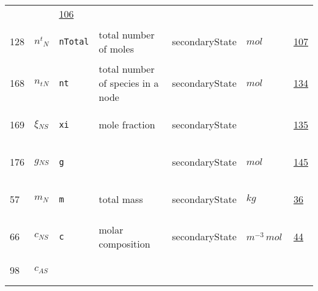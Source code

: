 \begin{longtable}{|p{1cm}|p{2.5cm}|p{4.5cm}|p{8cm}|p{3.0cm}|p{3cm}|p{1cm}|}
             & $  $
             &                 \hyperlink{"e:106"}{ 106 }
                 \\
            128
             & \hypertarget{"v:128"}{ $ {{n^t}}{_{N}} $}
             & \verb|nTotal|
             & total number of moles
             & \begin{lay}secondaryState \end{lay}
             & $ mol \, $
             &                 \hyperlink{"e:107"}{ 107 }
                 \\
            168
             & \hypertarget{"v:168"}{ $ {n_t}{_{N}} $}
             & \verb|nt|
             & total number of species in a node
             & \begin{lay}secondaryState \end{lay}
             & $ mol \, $
             &                 \hyperlink{"e:134"}{ 134 }
                 \\
            169
             & \hypertarget{"v:169"}{ $ {\xi}{_{{N S}}} $}
             & \verb|xi|
             & mole fraction
             & \begin{lay}secondaryState \end{lay}
             & $  $
             &                 \hyperlink{"e:135"}{ 135 }
                 \\
            176
             & \hypertarget{"v:176"}{ $ {g}{_{{N S}}} $}
             & \verb|g|
             & 
             & \begin{lay}secondaryState \end{lay}
             & $ mol \, $
             &                 \hyperlink{"e:145"}{ 145 }
                 \\
            57
             & \hypertarget{"v:57"}{ $ {m}{_{N}} $}
             & \verb|m|
             & total mass
             & \begin{lay}secondaryState \end{lay}
             & $ kg \, $
             &                 \hyperlink{"e:36"}{ 36 }
                 \\
            66
             & \hypertarget{"v:66"}{ $ {c}{_{{N S}}} $}
             & \verb|c|
             & molar composition
             & \begin{lay}secondaryState \end{lay}
             & $ m^{-3} \,mol \, $
             &                 \hyperlink{"e:44"}{ 44 }
                 \\
            98
             & \hypertarget{"v:98"}{ $ {c}{_{{A S}}} $}

\end{longtable}
